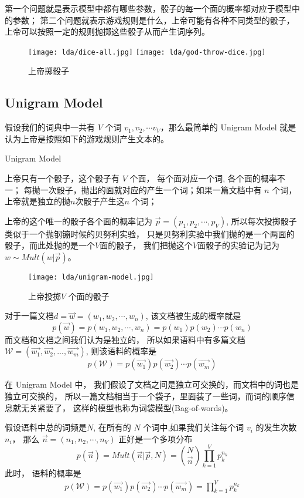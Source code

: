 第一个问题就是表示模型中都有哪些参数，骰子的每一个面的概率都对应于模型中的参数；
第二个问题就表示游戏规则是什么，上帝可能有各种不同类型的骰子，
上帝可以按照一定的规则抛掷这些骰子从而产生词序列。

\begin{figure}[htbp]
\centering
\texttt{[image: lda/dice-all.jpg]} \quad
\texttt{[image: lda/god-throw-dice.jpg]}
\caption{上帝掷骰子}
\end{figure}

\subsection{Unigram Model}
假设我们的词典中一共有 $V$ 个词 $v_1, v_2, \cdots v_V$，那么最简单的 Unigram Model 就是
认为上帝是按照如下的游戏规则产生文本的。

\begin{algorithm}[!ht]
\caption{Unigram Model}
\begin{algorithmic}[1]
\STATE 上帝只有一个骰子，这个骰子有 $V$ 个面， 每个面对应一个词, 各个面的概率不一；
\STATE 每抛一次骰子，抛出的面就对应的产生一个词；如果一篇文档中有 $n$ 个词，上帝就是独立的抛$n$次骰子产生这$n$ 个词；
\end{algorithmic}
\end{algorithm}

上帝的这个唯一的骰子各个面的概率记为 $\vec{p} = (p_1, p_2, \cdots, p_V)$,
所以每次投掷骰子类似于一个抛钢镚时候的贝努利实验， 
只是贝努利实验中我们抛的是一个两面的骰子，而此处抛的是一个$V$面的骰子，
我们把抛这个$V$面骰子的实验记为记为 $w\sim Mult(w|\vec{p}) $。
\begin{figure}[htbp]
\centering
\texttt{[image: lda/unigram-model.jpg]}
\caption{上帝投掷$V$ 个面的骰子}
\end{figure}

对于一篇文档$d=\vec{w}=(w_1, w_2, \cdots, w_n)$, 该文档被生成的概率就是
$$ p(\vec{w}) = p(w_1, w_2, \cdots, w_n) = p(w_1)p(w_2) \cdots p(w_n) $$
而文档和文档之间我们认为是独立的， 所以如果语料中有多篇文档
$\mathcal{W}=(\vec{w_1}, \vec{w_2},...,\vec{w_m})$,
则该语料的概率是
$$p(\mathcal{W})= p(\vec{w_1})p(\vec{w_2})
\cdots p(\vec{w_m}) $$

在 Unigram Model 中， 我们假设了文档之间是独立可交换的，而文档中的词也是独立可交换的，
所以一篇文档相当于一个袋子，里面装了一些词，而词的顺序信息就无关紧要了，
这样的模型也称为词袋模型(Bag-of-words)。

假设语料中总的词频是$N$, 在所有的 $N$ 个词中,如果我们关注每个词 $v_i$ 的发生次数 $n_i$，
那么 $\vec{n}=(n_1, n_2,\cdots, n_V)$ 正好是一个多项分布
$$ p(\vec{n}) = Mult(\vec{n}|\vec{p}, N)
= \binom{N}{\vec{n}} \prod_{k=1}^V p_k^{n_k} $$
此时， 语料的概率是
\begin{align*}
p(\mathcal{W})= p(\vec{w_1})p(\vec{w_2}) \cdots p(\vec{w_m})
= \prod_{k=1}^V p_k^{n_k}
\end{align*}

